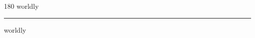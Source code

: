 
\begin{frame}
\begin{center}
\begin{turn}{180}
{\fontsize{2.5cm}{1em}\selectfont worldly}
\end{turn}
\vspace{1em}\par  
\hrule
\vspace{1em}\par  
{\fontsize{2.5cm}{1em}\selectfont worldly}
\end{center}
\end{frame}
